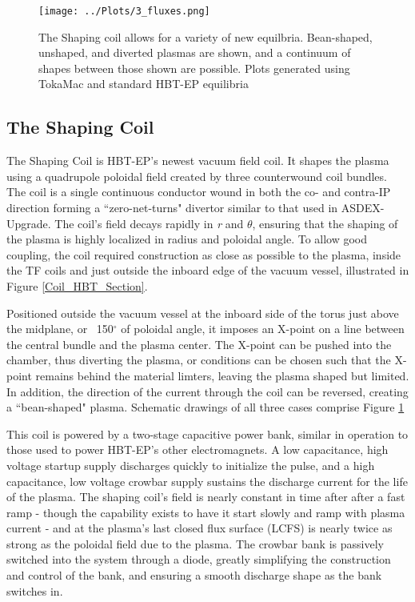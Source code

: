 \documentclass[aps,prl,twocolumn,superscriptaddress,groupedaddress]{revtex4}  %
\begin{document}
\begin{figure}[htb]
	\centering
\texttt{[image: ../Plots/3\_fluxes.png]}
	\caption{The Shaping coil allows for a variety of new equilbria.  Bean-shaped, unshaped, and diverted plasmas are shown, and a continuum of shapes between those shown are possible.  Plots generated using TokaMac and standard HBT-EP equilibria}
	\label{3_shapes}
	\end{figure}	

\subsection{The Shaping Coil}
    The Shaping Coil is HBT-EP's newest vacuum field coil.  It shapes the plasma using a quadrupole poloidal field created by three counterwound coil bundles.  The coil is a single continuous conductor wound in both the co- and contra-IP direction forming a ``zero-net-turns" divertor similar to that used in ASDEX-Upgrade\cite{Keilhacker}.  The coil's field decays rapidly in \textit{r} and \textit{$\theta$}, ensuring that the shaping of the plasma is highly localized in radius and poloidal angle.  To allow good coupling, the coil required construction as close as possible to the plasma, inside the TF coils and just outside the inboard edge of the vacuum vessel, illustrated in Figure \ref{Coil_HBT_Section}.\par
    Positioned outside the vacuum vessel at the inboard side of the torus just above the midplane, or ~150$^{\circ}$ of poloidal angle, it imposes an X-point on a line between the central bundle and the plasma center.  The X-point can be pushed into the chamber, thus diverting the plasma, or conditions can be chosen such that the X-point remains behind the material limters, leaving the plasma shaped but limited.  In addition, the direction of the current through the coil can be reversed, creating a ``bean-shaped" plasma.  Schematic drawings of all three cases comprise Figure \ref{3_shapes}\par
    
This coil is powered by a two-stage capacitive power bank, similar in operation to those used to power HBT-EP's other electromagnets\cite{Gates}. A low capacitance, high voltage startup supply discharges quickly to initialize the pulse, and a high capacitance, low voltage crowbar supply sustains the discharge current for the life of the plasma.  The shaping coil's field is nearly constant in time after after a fast ramp - though the capability exists to have it start slowly and ramp with plasma current - and at the plasma's last closed flux surface (LCFS) is nearly twice as strong as the poloidal field due to the plasma.  The crowbar bank is passively switched into the system through a diode, greatly simplifying the construction and control of the bank, and ensuring a smooth discharge shape as the bank switches in.
\end{document}
